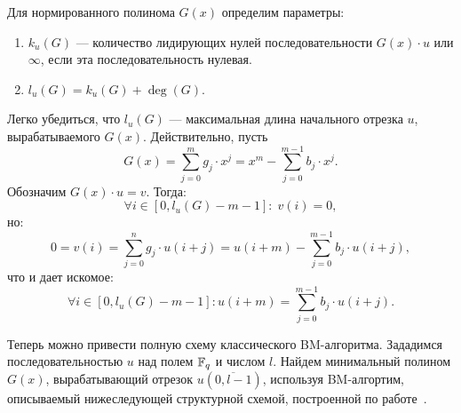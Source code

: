 \documentclass[14pt]{extarticle}
\begin{document}
Для нормированного полинома $G(x)$ определим параметры: 
\begin{enumerate}
\item  $k_{u} (G)$ — количество лидирующих нулей последовательности $G(x)\cdot u$ или $\infty$, если эта последовательность нулевая.

\item  $l_{u} (G)=k_{u} (G)+\deg (G)$.
\end{enumerate}

Легко убедиться, что $l_{u} (G)$ — максимальная длина начального отрезка $u$, вырабатываемого $G(x)$. Действительно, пусть
\[G(x)=\sum _{j=0}^{m}g_{j} \cdot x^{j} = x^{m} -\sum _{j=0}^{m-1}b_{j} \cdot x^{j}. \] 
Обозначим $G(x)\cdot u=v$. Тогда: 
$$\forall i\in [0,l_{u} (G)-m-1]:\;v(i)=0,$$
но:
\[0=v(i)=\sum _{j=0}^{n}g_{j} \cdot u(i+j)=u(i+m)-\sum _{j=0}^{m-1}b_{j} \cdot u(i+j),\] 
что и дает искомое:
$$\forall i\in [0,l_{u} (G)-m-1]:u(i+m)=\sum _{j=0}^{m-1}b_{j} \cdot u(i+j).$$ 

Теперь можно привести полную схему классического BM-ал\-го\-рит\-ма. Зададимся
последовательностью $u$ над полем $\mathbb F_q$ и числом $l$. Найдем минимальный
полином $G(x)$, вырабатывающий отрезок $u\left(\overline{0,l-1}\right)$,
используя BM-алгортим, описываемый нижеследующей структурной схемой, построенной
по работе~\cite{Kurakin94}.
\end{document}
